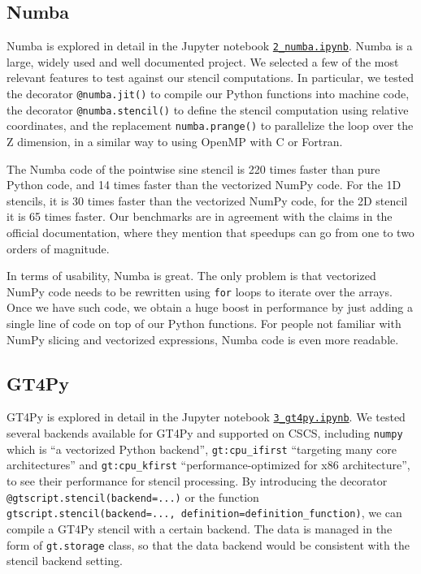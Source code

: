 \documentclass[12pt]{article}
\begin{document}
\subsection{Numba}

Numba is explored in detail in the Jupyter notebook \href{run:./2_numba.ipynb}{\texttt{2\_numba.ipynb}}. Numba is a large, widely used and well documented project. We selected a few of the most relevant features to test against our stencil computations. In particular, we tested the decorator \texttt{@numba.jit()} to compile our Python functions into machine code, the decorator \texttt{@numba.stencil()} to define the stencil computation using relative coordinates, and the replacement \texttt{numba.prange()} to parallelize the loop over the Z dimension, in a similar way to using OpenMP with C or Fortran.

The Numba code of the pointwise sine stencil is 220 times faster than pure Python code, and 14 times faster than the vectorized NumPy code. For the 1D stencils, it is 30 times faster than the vectorized NumPy code, for the 2D stencil it is 65 times faster. Our benchmarks are in agreement with the claims in the official documentation, where they mention that speedups can go from one to two orders of magnitude.

In terms of usability, Numba is great. The only problem is that vectorized NumPy code needs to be rewritten using \texttt{for} loops to iterate over the arrays. Once we have such code, we obtain a huge boost in performance by just adding a single line of code on top of our Python functions. For people not familiar with NumPy slicing and vectorized expressions, Numba code is even more readable.

\subsection{GT4Py}

GT4Py is explored in detail in the Jupyter notebook \href{run:./3_gt4py.ipynb}{\texttt{3\_gt4py.ipynb}}. We tested several backends available for GT4Py and supported on CSCS, including \texttt{numpy} which is ``a vectorized Python backend'', \texttt{gt:cpu\_ifirst} ``targeting many core architectures'' and \texttt{gt:cpu\_kfirst} ``performance-optimized for x86 architecture'', to see their performance for stencil processing. By introducing the decorator \texttt{@gtscript.stencil(backend=...)} or the function \texttt{gtscript.stencil(backend=..., definition=definition\_function)}, we can compile a GT4Py stencil with a certain backend. The data is managed in the form of \texttt{gt.storage} class, so that the data backend would be consistent with the stencil backend setting.
\end{document}
